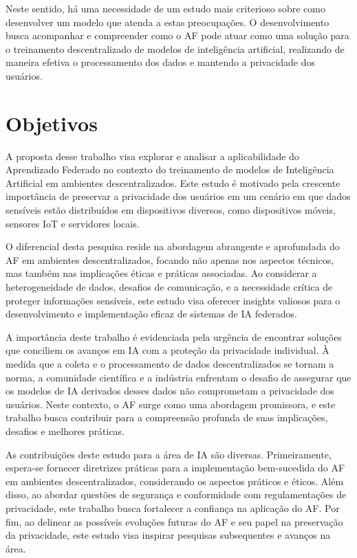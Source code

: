 Neste sentido, há uma necessidade de um estudo mais criterioso sobre como desenvolver um modelo que atenda a estas preocupações. O desenvolvimento busca acompanhar e compreender como o AF pode atuar como uma solução para o treinamento descentralizado de modelos de inteligência artificial, realizando de maneira efetiva o processamento dos dados e mantendo a privacidade dos usuários.

\section{Objetivos}
\label{sec:objetivos}

A proposta desse trabalho visa explorar e analisar a aplicabilidade do Aprendizado Federado no contexto do treinamento de modelos de Inteligência Artificial em ambientes descentralizados. Este estudo é motivado pela crescente importância de preservar a privacidade dos usuários em um cenário em que dados sensíveis estão distribuídos em dispositivos diversos, como dispositivos móveis, sensores IoT e servidores locais.

O diferencial desta pesquisa reside na abordagem abrangente e aprofundada do AF em ambientes descentralizados, focando não apenas nos aspectos técnicos, mas também nas implicações éticas e práticas associadas. Ao considerar a heterogeneidade de dados, desafios de comunicação, e a necessidade crítica de proteger informações sensíveis, este estudo visa oferecer insights valiosos para o desenvolvimento e implementação eficaz de sistemas de IA federados.

A importância deste trabalho é evidenciada pela urgência de encontrar soluções que conciliem os avanços em IA com a proteção da privacidade individual. À medida que a coleta e o processamento de dados descentralizados se tornam a norma, a comunidade científica e a indústria enfrentam o desafio de assegurar que os modelos de IA derivados desses dados não comprometam a privacidade dos usuários. Neste contexto, o AF surge como uma abordagem promissora, e este trabalho busca contribuir para a compreensão profunda de suas implicações, desafios e melhores práticas.

As contribuições deste estudo para a área de IA são diversas. Primeiramente, espera-se fornecer diretrizes práticas para a implementação bem-sucedida do AF em ambientes descentralizados, considerando os aspectos práticos e éticos. Além disso, ao abordar questões de segurança e conformidade com regulamentações de privacidade, este trabalho busca fortalecer a confiança na aplicação do AF. Por fim, ao delinear as possíveis evoluções futuras do AF e seu papel na preservação da privacidade, este estudo visa inspirar pesquisas subsequentes e avanços na área.

